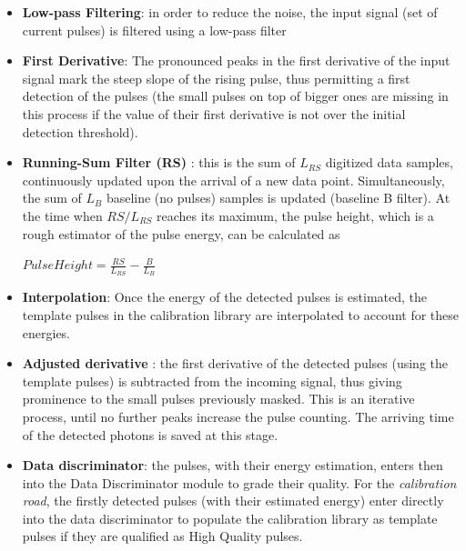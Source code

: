 \begin{itemize}
 \item \textbf{Low-pass Filtering}: in order to reduce the noise, the input signal (set of current pulses) is filtered using a low-pass filter
 \item \textbf{First Derivative}: The pronounced peaks in the first derivative of the input signal mark the steep slope of the rising pulse, thus 
 permitting a first detection of the pulses (the small pulses on top of bigger ones are missing in this process if the value of their first
 derivative is not over the initial detection threshold).
 \item \textbf{Running-Sum Filter (RS)} \citep{RS_2011}: this is the sum of $L_{RS}$ digitized data samples, continuously updated upon the arrival 
 of a new data point. Simultaneously, the sum of $L_B$ baseline (no pulses) samples is updated (baseline B filter).
 At the time when $RS/L_{RS}$ reaches its maximum, the pulse height, which is a rough estimator of the pulse energy, can 
 be calculated as 
 
 $ PulseHeight = \frac{RS}{L_{RS}} - \frac{B}{L_B} $
 
 \item \textbf{Interpolation}: Once the energy of the detected pulses is estimated, the template pulses in the calibration library are interpolated to account 
 for these energies.
 \item \textbf{Adjusted derivative} \citep{Boyce_1999}: the first derivative of the detected pulses (using the template pulses) is subtracted from the incoming signal, thus 
 giving prominence to the small pulses previously masked. This is an iterative process, until no further peaks increase the pulse counting.
 The arriving time of the detected photons is saved at this stage. 
 \item \textbf{Data discriminator}: the pulses, with their energy estimation, enters then into the Data Discriminator module to grade their quality. For 
 the \textit{calibration road}, the firstly detected pulses (with their estimated energy) enter directly into the data discriminator to populate the
 calibration library as template pulses if they are qualified as High Quality pulses.
\end{itemize}

